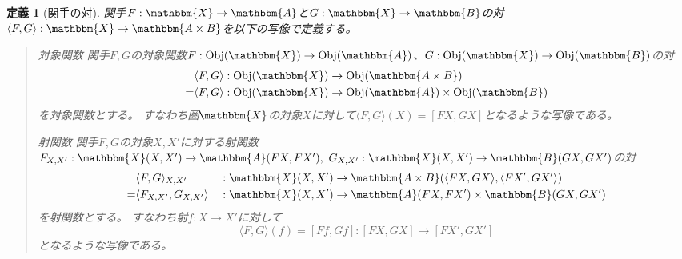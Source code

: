 \documentclass[uplatex,dvipdfmx]{jsarticle}
\newcommand{\cat}[1]{\mathbbm{#1}}
\newcommand{\arrow}{\rightarrow}
\newcommand{\functor}[3]{#1:\cat{#2}\arrow \cat{#3}}
\newcommand{\tuple}[1]{\langle #1\rangle}
\newcommand{\obj}[1]{\mathrm{Obj}(\cat{#1})}
\newcommand{\mor}[3]{#1:#2\arrow #3}
\newcommand{\arset}[3]{\cat{#1}(#2,#3)}
\newcommand{\pcobj}[1]{[#1]}
\newtheorem{define}[proof]{定義}
\numberwithin{proof}{subsection}
\newenvironment{mydescription}
{\begin{description}
  \setlength{\parskip}{0.5cm}
}
{\end{description}}
\begin{document}
	\begin{define}[関手の対]
		関手$\functor{F}{X}{A}$と$\functor{G}{X}{B}$の対$\functor{\tuple{F,G}}{X}{A\times B}$を以下の写像で定義する。
		\begin{quote}
			\begin{mydescription}
				\item[対象関数] 関手$F,G$の対象関数$\mor{F}{\obj{X}}{\obj{A}}$、$\mor{G}{\obj{X}}{\obj{B}}$の対
				\begin{align*}
					&\mor{\tuple{F,G}}{\obj{X}}{\obj{A\times B}}\\
					=&\mor{\tuple{F,G}}{\obj{X}}{\obj{A}\times \obj{B}}
				\end{align*}
				を対象関数とする。
				すなわち圏$\cat{X}$の対象$X$に対して$\tuple{F,G}(X)=\pcobj{FX,GX}$となるような写像である。
				\item[射関数]
				関手$F,G$の対象$X,X'$に対する射関数$\mor{F_{X,X'}}{\arset{X}{X}{X'}}{\arset{A}{FX}{FX'}},\ \mor{G_{X,X'}}{\arset{X}{X}{X'}}{\arset{B}{GX}{GX'}}$の対
				\begin{align*}
					&\mor{\tuple{F,G}_{X,X'}&&}{\arset{X}{X}{X'}}{\arset{A\times B}{\tuple{FX,GX}}{\tuple{FX',GX'}}}\\
					=&	\mor{\tuple{F_{X,X'},G_{X,X'}}&&}{\arset{X}{X}{X'}}{\arset{A}{FX}{FX'}\times\arset{B}{GX}{GX'}}
				\end{align*}
				を射関数とする。
				すなわち射$\mor{f}{X}{X'}$に対して\[\mor{\tuple{F,G}(f)=\pcobj{Ff,Gf}}{\pcobj{FX,GX}}{\pcobj{FX',GX'}}\]となるような写像である。


\end{mydescription}
\end{quote}
\end{define}
\end{document}
